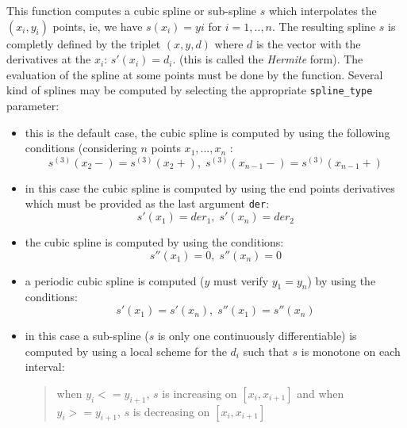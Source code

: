   \begin{mandescription}
    This function computes a cubic spline or sub-spline $s$ which interpolates the 
    $(x_i,y_i)$ points, ie, we have $s(x_i)=yi$ for $i=1,..,n$. 
    The resulting spline $s$ is completly defined by the triplet $(x,y,d)$ where
    $d$ is the vector with the derivatives at the $x_i$: $s'(x_i)=d_i$.
    (this is called the {\em Hermite} form). 
    The evaluation of the spline at some points must be done by the    function.
    Several kind of splines may be computed by selecting the appropriate \verb!spline_type!
    parameter: 
    
  \begin{itemize}

       \item {}  this is the default case, the cubic spline is computed by using the
             following conditions (considering $n$ points
             $x_1,...,x_n$ :
	     $$
    s^{(3)}(x_2-) = s^{(3)}(x_2+), \; s^{(3)}(x_{n-1}-) = s^{(3)}(x_{n-1}+)
         $$

       \item {} in this case the cubic spline is computed by using the end points
             derivatives which must be provided as the last argument \verb!der!:
    $$
    s'(x_1) = der_1, \; s'(x_n) = der_2
    $$     

       \item {} the cubic spline is computed by using the conditions:
    $$
    s''(x_1) = 0, \; s''(x_n) = 0
    $$     

       \item {} a periodic cubic spline is computed ($y$ must verify $y_1=y_n$)
              by using the conditions:
    $$
    s'(x_1) = s'(x_n), \;  s''(x_1) = s''(x_n)
    $$     

       \item {} in this case a sub-spline ($s$ is  only one continuously differentiable)
              is computed by using a local scheme for the $d_i$ such that
              $s$ is monotone on each interval:
    \begin{quote}
    when $y_i <= y_{i+1}$,  $s$ is increasing on $[x_i, x_{i+1}]$ \newline
    and when $y_i >= y_{i+1}$,  $s$ is decreasing on $[x_i, x_{i+1}]$ 
    \end{quote}


\end{itemize}
\end{mandescription}
